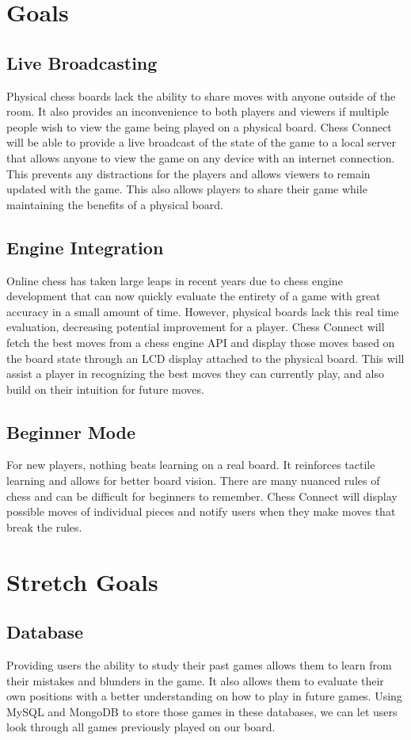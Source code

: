 \documentclass{article}
\begin{document}
\section{Goals}
\subsection{Live Broadcasting}
{Physical chess boards lack the ability to share moves with anyone outside of the room. It also provides an inconvenience to both players and viewers if multiple people wish to view the game being played on a physical board. 
Chess Connect will be able to provide a live broadcast of the state of the game to a local server that allows anyone to view the game on any device with an internet connection. 
This prevents any distractions for the players and allows viewers to remain updated with the game. This also allows players to share their game while maintaining the benefits of a physical board.} 

\subsection{Engine Integration}
{Online chess has taken large leaps in recent years due to chess engine development that can now quickly evaluate the entirety of a game with great accuracy in a small amount of time. 
However, physical boards lack this real time evaluation, decreasing potential improvement for a player. Chess Connect will fetch the best moves from a chess engine API and display those moves based on the board state through an LCD display attached to the physical board. 
This will assist a player in recognizing the best moves they can currently play, and also build on their intuition for future moves.}

\subsection{Beginner Mode}
{For new players, nothing beats learning on a real board. It reinforces tactile learning and allows for better board vision. There are many nuanced rules of chess and can be difficult for beginners to remember. 
Chess Connect will display possible moves of individual pieces and notify users when they make moves that break the rules.}

\section{Stretch Goals}
\subsection{Database}
{Providing users the ability to study their past games allows them to learn from their mistakes and blunders in the game. It also allows them to evaluate their own positions with a better understanding on how to play in future games. 
Using MySQL and MongoDB to store those games in these databases, we can let users look through all games previously played on our board.}
\end{document}
